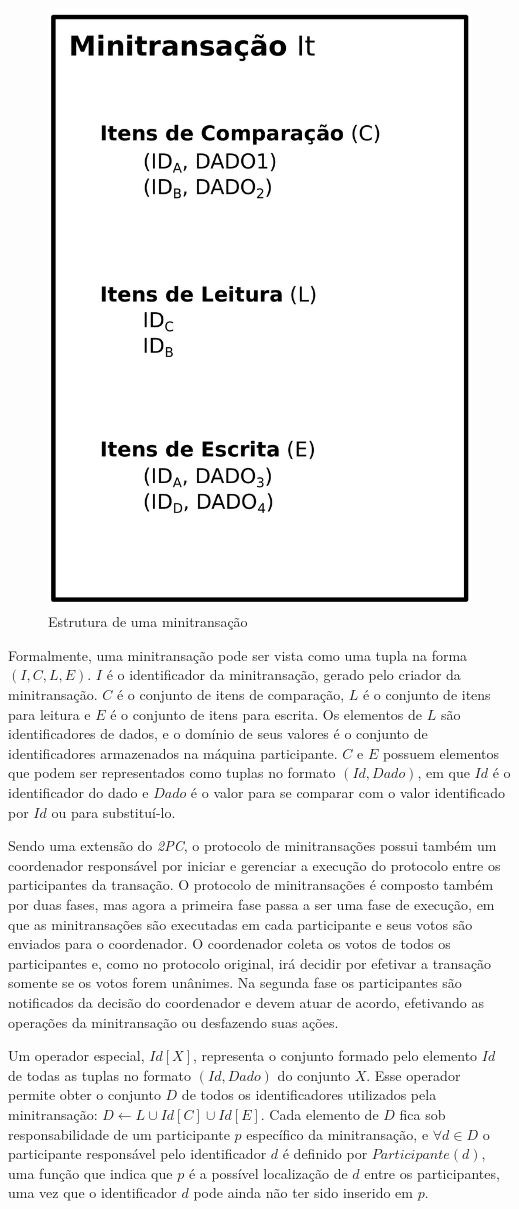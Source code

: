 \documentclass[11pt,twoside,a4paper]{book}
\begin{document}
\begin{figure}
  \centering
  \includegraphics[width=.40\textwidth]{estrutura_minitransacao} 
  \caption{Estrutura de uma minitransação}
  \label{fig:estrutura_minitransacao} 
\end{figure}

Formalmente, uma minitransação pode ser vista como uma tupla na forma $(I, C, L, E)$. $I$ é o identificador da minitransação, gerado pelo criador da minitransação. \(C\) é o conjunto de itens de comparação, \(L\) é o conjunto de itens para leitura e \(E\) é o conjunto de itens para escrita. Os elementos de \(L\) são identificadores de dados, e o domínio de seus valores é o conjunto de identificadores armazenados na máquina participante. \(C\) e \(E\) possuem elementos que podem ser representados como tuplas no formato \((Id, Dado)\), em que \(Id\) é o identificador do dado e \(Dado\) é o valor para se comparar com o valor identificado por $Id$ ou para substituí-lo.

Sendo uma extensão do \emph{2PC}, o protocolo de minitransações possui também um coordenador responsável por iniciar e gerenciar a execução do protocolo entre os participantes da transação. O protocolo de minitransações é composto também por duas fases, mas agora a primeira fase passa a ser uma fase de execução, em que as minitransações são executadas em cada participante e seus votos são enviados para o coordenador. O coordenador coleta os votos de todos os participantes e, como no protocolo original, irá decidir por efetivar a transação somente se os votos forem unânimes. Na segunda fase os participantes são notificados da decisão do coordenador e devem atuar de acordo, efetivando as operações da minitransação ou desfazendo suas ações.

Um operador especial, $Id[X]$, representa o conjunto formado pelo elemento $Id$ de todas as tuplas no formato $(Id, Dado)$ do conjunto $X$. Esse operador permite obter o conjunto $D$ de todos os identificadores utilizados pela minitransação: $D \gets L \cup Id[C] \cup Id[E]$. Cada elemento de $D$ fica sob responsabilidade de um participante $p$ específico da minitransação, e $\forall d \in D$ o participante responsável pelo identificador $d$ é definido por $Participante(d)$, uma função que indica que $p$ é a possível localização de $d$ entre os participantes, uma vez que o identificador $d$ pode ainda não ter sido inserido em $p$.
\end{document}
